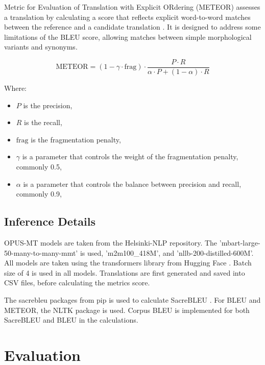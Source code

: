 \documentclass[a4paper]{article}
\begin{document}
Metric for Evaluation of Translation with Explicit ORdering (METEOR) \cite{lavie-2007-meteor} assesses a translation by calculating a score that reflects explicit word-to-word matches between the reference and a candidate translation \cite{agarwal-2008-meteor-mbleu-mter}. It is designed to address some limitations of the BLEU score, allowing matches between simple morphological variants and synonyms.

\begin{equation}
    \text{METEOR} = (1 - \gamma \cdot \text{frag}) \cdot \frac{P \cdot R}{\alpha \cdot P + (1 - \alpha) \cdot R}
\end{equation}

Where:
\begin{itemize}
    \item \(P\) is the precision,
    \item \(R\) is the recall,
    \item \(\text{frag}\) is the fragmentation penalty,
    \item \(\gamma\) is a parameter that controls the weight of the fragmentation penalty, commonly 0.5,
    \item \(\alpha\) is a parameter that controls the balance between precision and recall, commonly 0.9,
\end{itemize}

\subsection{Inference Details}

OPUS-MT models are taken from the Helsinki-NLP repository. The 'mbart-large-50-many-to-many-mmt' is used, 'm2m100\_418M', and 'nllb-200-distilled-600M'. All models are taken using the transformers \cite{wolf-etal-2020-transformers} library from Hugging Face \cite{huggingface}. Batch size of 4 is used in all models. Translations are first generated and saved into CSV files, before calculating the metrics score.

The sacrebleu packages from pip is used to calculate SacreBLEU \cite{post-2018-sacrebleu}. For BLEU and METEOR, the NLTK \cite{bird-2009-natural} package is used. Corpus BLEU is implemented for both SacreBLEU and BLEU in the calculations.
\section{Evaluation}
\end{document}
